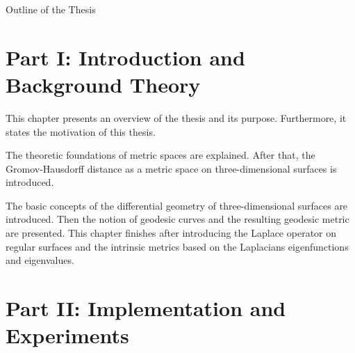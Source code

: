 \clearemptydoublepage

{}

\begin{center}
	\huge{Outline of the Thesis}
\end{center}




\section*{Part I: Introduction and Background Theory}

  \vspace{1mm}

\noindent  This chapter presents an overview of the thesis and its purpose. Furthermore, it states the motivation of this thesis.  \\

  \vspace{1mm}

\noindent  The theoretic foundations of metric spaces are explained. After that, the Gromov-Hausdorff distance as a metric space on three-dimensional surfaces is introduced.   \\

  \vspace{1mm}

\noindent  The basic concepts of the differential geometry of three-dimensional surfaces are introduced. Then the notion of geodesic curves and the resulting geodesic metric are presented.
This chapter finishes after introducing the Laplace operator on regular surfaces and the intrinsic metrics based on the Laplacians eigenfunctions and eigenvalues.\\



\section*{Part II: Implementation and Experiments}

